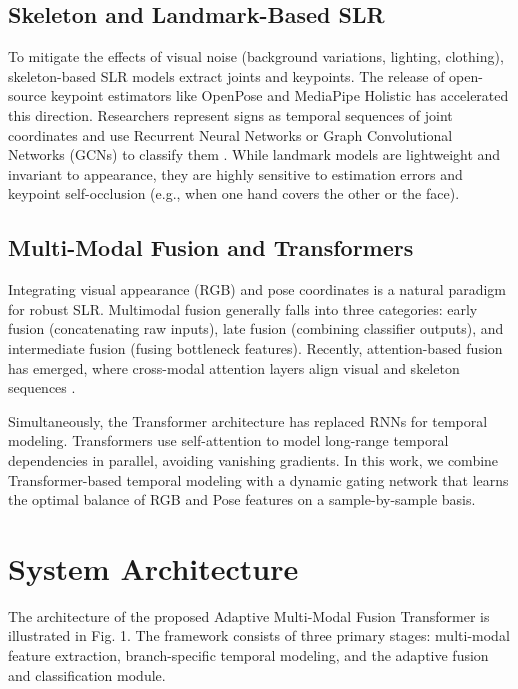 \documentclass[conference]{IEEEtran}
\begin{document}
\subsection{Skeleton and Landmark-Based SLR}
To mitigate the effects of visual noise (background variations, lighting, clothing), skeleton-based SLR models extract joints and keypoints. The release of open-source keypoint estimators like OpenPose and MediaPipe Holistic \cite{ref_mediapipe} has accelerated this direction. Researchers represent signs as temporal sequences of joint coordinates and use Recurrent Neural Networks or Graph Convolutional Networks (GCNs) to classify them \cite{ref_gcn}. While landmark models are lightweight and invariant to appearance, they are highly sensitive to estimation errors and keypoint self-occlusion (e.g., when one hand covers the other or the face).

\subsection{Multi-Modal Fusion and Transformers}
Integrating visual appearance (RGB) and pose coordinates is a natural paradigm for robust SLR. Multimodal fusion generally falls into three categories: early fusion (concatenating raw inputs), late fusion (combining classifier outputs), and intermediate fusion (fusing bottleneck features). Recently, attention-based fusion has emerged, where cross-modal attention layers align visual and skeleton sequences \cite{ref_crossattention}. 

Simultaneously, the Transformer architecture \cite{ref_transformer} has replaced RNNs for temporal modeling. Transformers use self-attention to model long-range temporal dependencies in parallel, avoiding vanishing gradients. In this work, we combine Transformer-based temporal modeling with a dynamic gating network that learns the optimal balance of RGB and Pose features on a sample-by-sample basis.

\section{System Architecture}
The architecture of the proposed Adaptive Multi-Modal Fusion Transformer is illustrated in Fig. 1. The framework consists of three primary stages: multi-modal feature extraction, branch-specific temporal modeling, and the adaptive fusion and classification module.
\end{document}

